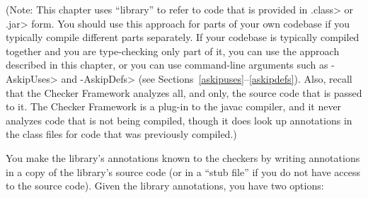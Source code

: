 (Note: This chapter uses ``library'' to refer to code that is provided in
\<.class> or \<.jar> form.  You should use this approach for parts of your
own codebase if you typically compile different parts separately.  If
your codebase is typically compiled together and you are type-checking only
part of it, you can use the approach described in this chapter, or you can
use command-line arguments such as \<-AskipUses> and \<-AskipDefs> (see
Sections~\ref{askipuses}--\ref{askipdefs}).  Also, recall that the Checker
Framework analyzes all, and only, the source code that is passed to it.
The Checker Framework is a plug-in to the javac compiler, and it never
analyzes code that is not being compiled, though it does look up
annotations in the class files for code that was previously compiled.)

You make the library's annotations known to the checkers by writing
annotations in a copy of the library's source code (or in a ``stub
file'' if you do not have access to the source code).
Given the library annotations, you have two options:

